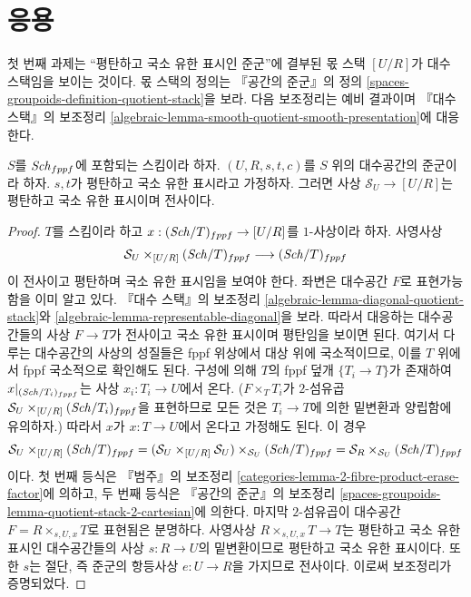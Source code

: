 \section{응용}
\label{section-applications}

\noindent
첫 번째 과제는 ``평탄하고 국소 유한 표시인 준군''에 결부된 몫 스택
$[U/R]$가 대수 스택임을 보이는 것이다. 몫 스택의 정의는
『공간의 준군』의 정의
\ref{spaces-groupoids-definition-quotient-stack}을 보라.
다음 보조정리는 예비 결과이며 『대수 스택』의 보조정리
\ref{algebraic-lemma-smooth-quotient-smooth-presentation}에 대응한다.

\begin{lemma}
\label{lemma-flat-quotient-flat-presentation}
$S$를 $\mathit{Sch}_{fppf}$에 포함되는 스킴이라 하자.
$(U, R, s, t, c)$를 $S$ 위의 대수공간의 준군이라 하자.
$s, t$가 평탄하고 국소 유한 표시라고 가정하자. 그러면 사상
$\mathcal{S}_U \to [U/R]$는 평탄하고 국소 유한 표시이며 전사이다.
\end{lemma}

\begin{proof}
$T$를 스킴이라 하고 $x : (\mathit{Sch}/T)_{fppf} \to [U/R]$를
$1$-사상이라 하자. 사영사상
$$
\mathcal{S}_U \times_{[U/R]} (\mathit{Sch}/T)_{fppf}
\longrightarrow
(\mathit{Sch}/T)_{fppf}
$$
이 전사이고 평탄하며 국소 유한 표시임을 보여야 한다. 좌변은
대수공간 $F$로 표현가능함을 이미 알고 있다. 『대수 스택』의 보조정리
\ref{algebraic-lemma-diagonal-quotient-stack}와
\ref{algebraic-lemma-representable-diagonal}을 보라. 따라서 대응하는
대수공간들의 사상 $F \to T$가 전사이고 국소 유한 표시이며 평탄임을
보이면 된다. 여기서 다루는 대수공간의 사상의 성질들은 fppf 위상에서
대상 위에 국소적이므로, 이를 $T$ 위에서 fppf 국소적으로 확인해도 된다.
구성에 의해 $T$의 fppf 덮개 $\{T_i \to T\}$가 존재하여
$x|_{(\mathit{Sch}/T_i)_{fppf}}$는 사상 $x_i : T_i \to U$에서 온다.
($F \times_T T_i$가 $2$-섬유곱
$\mathcal{S}_U \times_{[U/R]} (\mathit{Sch}/T_i)_{fppf}$을 표현하므로 모든 것은
$T_i \to T$에 의한 밑변환과 양립함에 유의하자.) 따라서 $x$가
$x : T \to U$에서 온다고 가정해도 된다. 이 경우
$$
\mathcal{S}_U \times_{[U/R]} (\mathit{Sch}/T)_{fppf}
=
(\mathcal{S}_U \times_{[U/R]} \mathcal{S}_U)
\times_{\mathcal{S}_U} (\mathit{Sch}/T)_{fppf}
=
\mathcal{S}_R \times_{\mathcal{S}_U} (\mathit{Sch}/T)_{fppf}
$$
이다. 첫 번째 등식은 『범주』의 보조정리
\ref{categories-lemma-2-fibre-product-erase-factor}에 의하고,
두 번째 등식은 『공간의 준군』의 보조정리
\ref{spaces-groupoids-lemma-quotient-stack-2-cartesian}에 의한다.
마지막 $2$-섬유곱이 대수공간 $F = R \times_{s, U, x} T$로 표현됨은
분명하다. 사영사상 $R \times_{s, U, x} T \to T$는 평탄하고 국소 유한
표시인 대수공간들의 사상 $s : R \to U$의 밑변환이므로 평탄하고
국소 유한 표시이다. 또한 $s$는 절단, 즉 준군의 항등사상
$e : U \to R$을 가지므로 전사이다. 이로써 보조정리가 증명되었다.
\end{proof}

